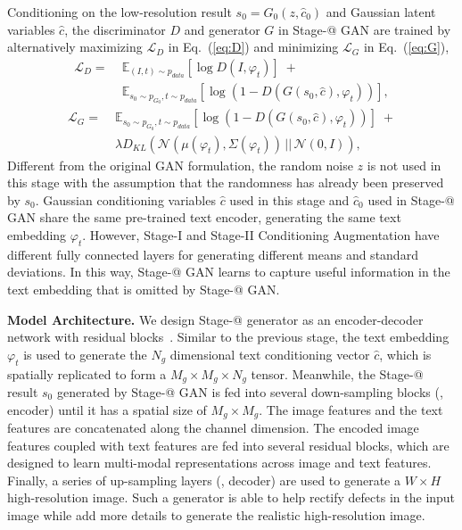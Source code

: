 \documentclass[10pt,twocolumn,letterpaper]{article}
\makeatletter
\newcommand{\Rmnum}[1]{\expandafter\@slowromancap\romannumeral #1@}
\makeatother
\begin{document}
Conditioning on the low-resolution result $s_0 = G_0(z, \hat{c}_0)$ and Gaussian latent variables $\hat{c}$, the discriminator $D$ and generator $G$ in Stage-\Rmnum{2} GAN are trained by alternatively maximizing $\mathcal{L}_{D}$ in Eq.~(\ref{eq:D}) and minimizing $\mathcal{L}_{G}$ in Eq.~(\ref{eq:G}), 
\begin{equation}\label{eq:D}
\begin{aligned}
\mathcal{L}_{D} =  &\; \mathbb{E}_{(I,t) \sim {p_{data}}} [\log D(I, \varphi_{t})] \; + \\
&\; \mathbb{E}_{s_0 \sim {p_{G_0}}, t \sim p_{data}} [\log(1 - D(G(s_0, \hat{c}), \varphi_{t}))],
\end{aligned}
\end{equation}
\begin{equation}\label{eq:G}
\begin{aligned}
\mathcal{L}_{G} = &\; \mathbb{E}_{s_0 \sim {p_{G_0}}, t \sim p_{data}} [\log(1 - D(G(s_0, \hat{c}), \varphi_{t}))] \; + \\
                    &\; \lambda D_{KL}(\mathcal{N}(\mu(\varphi_{t}), \Sigma(\varphi_{t})) \, || \, \mathcal{N}(0, I)), 
\end{aligned}
\end{equation}
Different from the original GAN formulation, the random noise $z$ is not used in this stage with the assumption that the randomness has already been preserved by $s_0$. 
Gaussian conditioning variables $\hat{c}$ used in this stage and $\hat{c}_0$ used in Stage-\Rmnum{1} GAN share the same pre-trained text encoder, generating the same text embedding $\varphi_{t}$. 
However, Stage-I and Stage-II Conditioning Augmentation have different fully connected layers for generating different means and standard deviations. In this way, Stage-\Rmnum{2} GAN learns to capture useful information in the text embedding that is omitted by Stage-\Rmnum{1} GAN.


\textbf{Model Architecture. }
We design Stage-\Rmnum{2} generator as an encoder-decoder network with residual blocks~\cite{HeZRS15}. 
Similar to the previous stage, the text embedding $\varphi_{t}$ is used to generate the $N_g$ dimensional text conditioning vector $\hat{c}$, which is spatially replicated to form a $M_{g} \times M_{g} \times N_g$ tensor. 
Meanwhile, the Stage-\Rmnum{1} result $s_0$ generated by Stage-\Rmnum{1} GAN is fed into several down-sampling blocks (\ie, encoder) until it has a spatial size of $M_{g} \times M_{g}$. The image features and the text features are concatenated along the channel dimension. 
The encoded image features coupled with text features are fed into several residual blocks, which are designed to learn multi-modal representations across image and text features. 
Finally, a series of up-sampling layers (\ie, decoder) are used to generate a $W \times H$ high-resolution image. Such a generator is able to help rectify defects in the input image while add more details to generate the realistic high-resolution image.
\end{document}
